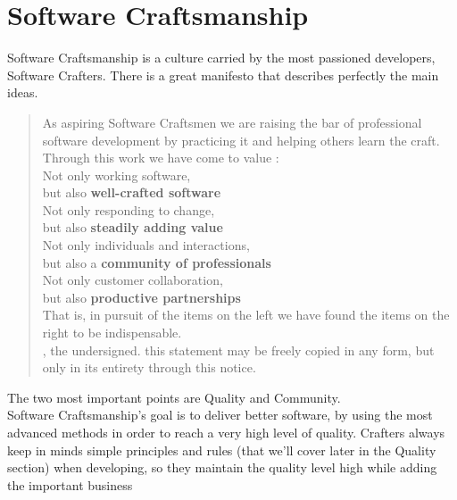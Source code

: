 \section{Software Craftsmanship}\label{sec:software-craftsmanship}
Software Craftsmanship is a culture carried by the most passioned
developers, Software Crafters.
There is a great manifesto that describes perfectly the main ideas.

\begin{quotation}
As aspiring Software Craftsmen we are raising the bar of professional
software development by practicing it and helping others learn the craft.
\\
\newline
Through this work we have come to value : \\
\newline
Not only working software, \\
\hspace*{1cm} but also \textbf{well-crafted software}\\
Not only responding to change, \\
\hspace*{1cm} but also \textbf{steadily adding value} \\
Not only individuals and interactions, \\
\hspace*{1cm} but also a \textbf{community of professionals} \\
Not only customer collaboration, \\
\hspace*{1cm} but also \textbf{productive partnerships} \\
\newline
That is, in pursuit of the items on the left we have found the items
on the right to be indispensable. \\
\newline
\small{, the undersigned.
this statement may be freely copied in any form,
but only in its entirety through this notice.}
\end{quotation}
The two most important points are Quality and Community. \\
Software Craftsmanship's goal is to deliver better software, by using the
most advanced methods in order to reach a very high level of quality.
Crafters always keep in minds simple principles and rules
(that we'll cover later in the Quality section) when developing, so they
maintain the quality level high while adding the important business
